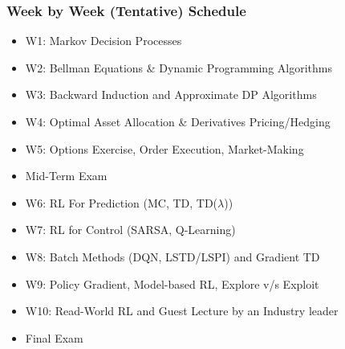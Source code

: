 \documentclass[handout]{beamer}
\begin{document}
\begin{frame}
\frametitle{Week by Week (Tentative) Schedule}
\pause
\begin{itemize}[<+->]
\item W1: Markov Decision Processes
\item W2: Bellman Equations \& Dynamic Programming Algorithms
\item W3: Backward Induction and Approximate DP Algorithms
\item W4: Optimal Asset Allocation \& Derivatives Pricing/Hedging
\item W5: Options Exercise,  Order Execution, Market-Making
\item Mid-Term Exam
\item W6: RL For Prediction (MC, TD, TD($\lambda$))
\item W7: RL for Control (SARSA, Q-Learning)
\item W8: Batch Methods (DQN, LSTD/LSPI) and Gradient TD
\item W9: Policy Gradient, Model-based RL, Explore v/s Exploit
\item W10: Read-World RL and Guest Lecture by an Industry leader
\item Final Exam
\end{itemize}
\end{frame}
\end{document}
